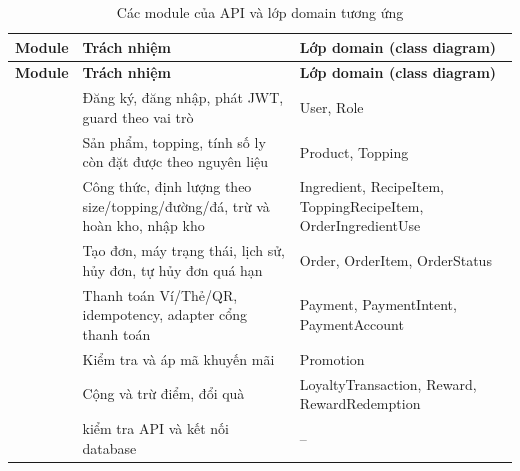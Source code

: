 {\small
\begin{longtable}{@{}L{2.2cm}L{7cm}L{4.7cm}@{}}
\caption{Các module của API và lớp domain tương ứng}\label{tab:module}\\
\toprule
\textbf{Module} & \textbf{Trách nhiệm} & \textbf{Lớp domain (class diagram)} \\ \midrule \endfirsthead
\toprule \textbf{Module} & \textbf{Trách nhiệm} & \textbf{Lớp domain (class diagram)} \\ \midrule \endhead
\bottomrule \endfoot
{} & Đăng ký, đăng nhập, phát JWT, guard theo vai trò & User, Role \\
 & Sản phẩm, topping, tính số ly còn đặt được theo nguyên liệu & Product, Topping \\
 & Công thức, định lượng theo size/topping/đường/đá, trừ và hoàn kho, nhập kho & Ingredient, RecipeItem, ToppingRecipeItem, OrderIngredientUse \\
 & Tạo đơn, máy trạng thái, lịch sử, hủy đơn, tự hủy đơn quá hạn & Order, OrderItem, OrderStatus \\
 & Thanh toán Ví/Thẻ/QR, idempotency, adapter cổng thanh toán & Payment, PaymentIntent, PaymentAccount \\
 & Kiểm tra và áp mã khuyến mãi & Promotion \\
 & Cộng và trừ điểm, đổi quà & LoyaltyTransaction, Reward, RewardRedemption \\
 &  kiểm tra API và kết nối database & -- \\
\end{longtable}
}